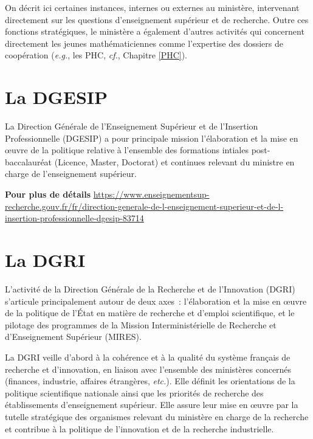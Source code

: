 On décrit ici certaines instances, internes ou externes au minist\`ere, 
intervenant directement sur les questions d'enseignement sup\'erieur et de recherche. Outre ces fonctions \og strat\'egiques\fg{}, le minist\`ere a \'egalement d'autres activit\'es qui concernent directement les jeunes math\'ematicien\mp ne\mp s comme l'expertise des dossiers de coop\'eration ({\em e.g.}, les PHC, {\em cf.}, Chapitre \ref{PHC}).

\section{La DGESIP} \label{DGESIP}
La Direction G\'en\'erale de l'Enseignement Sup\'erieur et de l'Insertion Professionnelle (DGESIP) a
pour principale mission l'\'elabo\-ration et la mise en \oe{}uvre de la politique relative \`a l'ensemble des formations
intiales post-baccalaur\'eat (Licence, Master, Doctorat) et continues relevant du ministre en charge de l'enseignement sup\'erieur.

\textbf{Pour plus de d\'etails\hspace{0.5em}} \url{https://www.enseignementsup-recherche.gouv.fr/fr/direction-generale-de-l-enseignement-superieur-et-de-l-insertion-professionnelle-dgesip-83714}

\section{La DGRI}
L'activit\'e de la Direction G\'en\'erale de la Recherche et de l'Innovation (DGRI) s'articule principalement autour de deux axes~: 
l'\'elaboration et la mise en \oe uvre de la politique de l'\'Etat en mati\`ere de recherche et d'emploi scientifique,
et le pilotage des programmes de la Mission Interminist\'erielle de Recherche et d'Enseignement Sup\'erieur (MIRES).

La DGRI veille d'abord \`a la coh\'erence et \`a la qualit\'e du
syst\`eme fran\c cais de recherche et d'innovation, en liaison avec
l'ensemble des minist\`eres concern\'es (finances, industrie,
affaires \'etrang\`eres, {\em etc.}). Elle d\'efinit les
orientations de la politique scientifique nationale ainsi que les
priorit\'es de recherche des \'etablissements d'enseignement
sup\'erieur. Elle assure leur mise en \oe uvre par la tutelle
strat\'egique des organismes relevant du minist\`ere en charge de la
recherche et contribue \`a la politique de l'innovation et de la
recherche industrielle.

